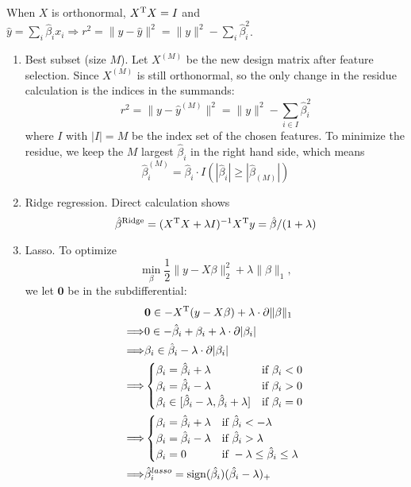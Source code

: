 \begin{sol}
When $X$ is orthonormal, $X^{\mathrm{T}}X=I$ and $\hat{y}=\sum_i\hat{\beta}_ix_i\Rightarrow r^2=\|y-\hat{y}\|^2=\|y\|^2-\sum_i \hat{\beta}_i^2$.
\begin{enumerate}
	\item Best subset (size $M$). Let $X^{(M)}$ be the new design matrix after feature selection. Since $X^{(M)}$ is still orthonormal, so the only change in the residue calculation is the indices in the summands:
	\[
	r^2=\|y-\hat{y}^{(M)}\|^2=\|y\|^2-\sum_{i\in I} \hat{\beta}_i^2
	\]
	where $I$ with $|I|=M$ be the index set of the chosen features. To minimize the residue, we keep the $M$ largest $\hat{\beta}_i$ in the right hand side, which means
	\[
	\hat{\beta}_i^{(M)}=\hat{\beta}_i\cdot I(|\hat{\beta}_i|\ge |\hat{\beta}_{(M)}|)
	\]
	\item Ridge regression. Direct calculation shows
	\[
	\hat{\beta}^{\mathrm{Ridge}}=(X^{\mathrm{T}}X+\lambda I)^{-1}X^{\mathrm{T}}y=\hat{\beta}/(1+\lambda)
	\]
	\item Lasso. To optimize
	\[
	\min_\beta \frac{1}{2}\|y-X\beta\|_2^2+\lambda \|\beta\|_1,
	\] 
	we let $\bm{0}$ be in the subdifferential:
	\begin{align*}
	&\bm{0}\in-X^{\mathrm{T}}(y-X\beta)+\lambda\cdot\partial\|\beta\|_1\\
	\Longrightarrow & 0\in -\hat{\beta}_i+\beta_i+\lambda\cdot\partial|\beta_i|\\
	\Longrightarrow & \beta_i\in\hat{\beta}_i-\lambda\cdot\partial|\beta_i|\\
	\Longrightarrow & \begin{cases}
	\beta_i=\hat{\beta}_i+\lambda & \mbox{if } \beta_i<0\\
	\beta_i=\hat{\beta}_i-\lambda & \mbox{if } \beta_i>0\\
	\beta_i\in[\hat{\beta}_i-\lambda, \hat{\beta}_i+\lambda] & \mbox{if } \beta_i=0
	\end{cases}\\
	\Longrightarrow & \begin{cases}
	\beta_i=\hat{\beta}_i+\lambda & \mbox{if } \hat{\beta}_i<-\lambda\\
	\beta_i=\hat{\beta}_i-\lambda & \mbox{if } \hat{\beta}_i>\lambda\\
	\beta_i=0 & \mbox{if }-\lambda\le\hat{\beta}_i\le\lambda
	\end{cases}\\
	\Longrightarrow & \hat{\beta}_i^{lasso}=\operatorname{sign}(\hat{\beta_i})(\hat{\beta_i}-\lambda)_+
	\end{align*}
\end{enumerate}
\end{sol}


